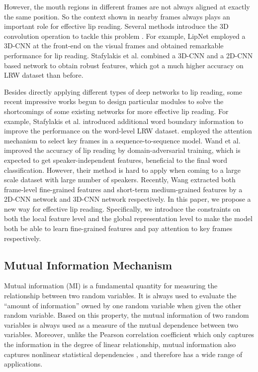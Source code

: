\documentclass[a4paper, 10pt, conference]{ieeeconf}      \usepackage{FG2020}
\begin{document}
However, the mouth regions in different frames are not always aligned at exactly the same position. So the context shown in nearby frames always plays an important role for effective lip reading. Several methods introduce the 3D convolution operation to tackle this problem \cite{petridis2018end,stafylakis2018pushing,yang2018lrw}. For example, LipNet \cite{assael2016lipnet} employed a 3D-CNN at the front-end on the visual frames and obtained remarkable performance for lip reading. Stafylakis et al. \cite{stafylakis2017combining} combined a 3D-CNN and a 2D-CNN based network to obtain robust features, which got a much higher accuracy on LRW dataset than before.

Besides directly applying different types of deep networks to lip reading, some recent impressive works begun to design particular modules to solve the shortcomings of some existing networks for more effective lip reading. For example, Stafylakis et al. \cite{stafylakis2018pushing} introduced additional word boundary information to improve the performance on the word-level LRW dataset. \cite{chung2017lip} employed the attention mechanism to select key frames in a sequence-to-sequence model. Wand et al. \cite{wand2017improving} improved the accuracy of lip reading by domain-adversarial training, which is expected to get speaker-independent features, beneficial to the final word classification. However, their method is hard to apply when coming to a large scale dataset with large number of speakers. Recently, Wang \cite{wang2019multi} extracted both frame-level fine-grained features and short-term medium-grained features by a 2D-CNN network and 3D-CNN network respectively. In this paper, we propose a new way for effective lip reading. Specifically, we introduce the constraints on both the local feature level and the global representation level to make the model both be able to learn fine-grained features and pay attention to key frames respectively. 
\subsection{Mutual Information Mechanism}
Mutual information (MI) is a fundamental quantity for measuring the relationship between two random variables. It is always used to evaluate the ``amount of information'' owned by one random variable when given the other random variable. Based on this property, the mutual information of two random variables is always used as a measure of the mutual dependence between two variables. Moreover, unlike the Pearson correlation coefficient which only captures the information in the degree of linear relationship, mutual information also captures nonlinear statistical dependencies \cite{kinney2014equitability}, and therefore has a wide range of applications.
\end{document}
